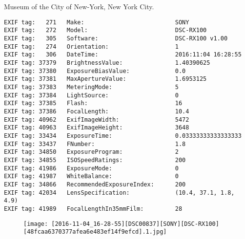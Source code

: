 \section{\protect{}}
\noindent Museum of the City of New-York, New York City.
\noindent
\begin{lstlisting}
EXIF tag:   271   Make:                          SONY
EXIF tag:   272   Model:                         DSC-RX100
EXIF tag:   305   Software:                      DSC-RX100 v1.00
EXIF tag:   274   Orientation:                   1
EXIF tag:   306   DateTime:                      2016:11:04 16:28:55
EXIF tag: 37379   BrightnessValue:               1.40390625
EXIF tag: 37380   ExposureBiasValue:             0.0
EXIF tag: 37381   MaxApertureValue:              1.6953125
EXIF tag: 37383   MeteringMode:                  5
EXIF tag: 37384   LightSource:                   0
EXIF tag: 37385   Flash:                         16
EXIF tag: 37386   FocalLength:                   10.4
EXIF tag: 40962   ExifImageWidth:                5472
EXIF tag: 40963   ExifImageHeight:               3648
EXIF tag: 33434   ExposureTime:                  0.03333333333333333
EXIF tag: 33437   FNumber:                       1.8
EXIF tag: 34850   ExposureProgram:               2
EXIF tag: 34855   ISOSpeedRatings:               200
EXIF tag: 41986   ExposureMode:                  0
EXIF tag: 41987   WhiteBalance:                  0
EXIF tag: 34866   RecommendedExposureIndex:      200
EXIF tag: 42034   LensSpecification:             (10.4, 37.1, 1.8, 4.9)
EXIF tag: 41989   FocalLengthIn35mmFilm:         28

\end{lstlisting}
\clearpage
\begin{figure}
\raggedleft
\texttt{[image: [2016-11-04\_16-28-55][DSC00837][SONY][DSC-RX100][48fcaa6370377afea6e483ef14f9efcd].1.jpg]}
\end{figure}


\clearpage
